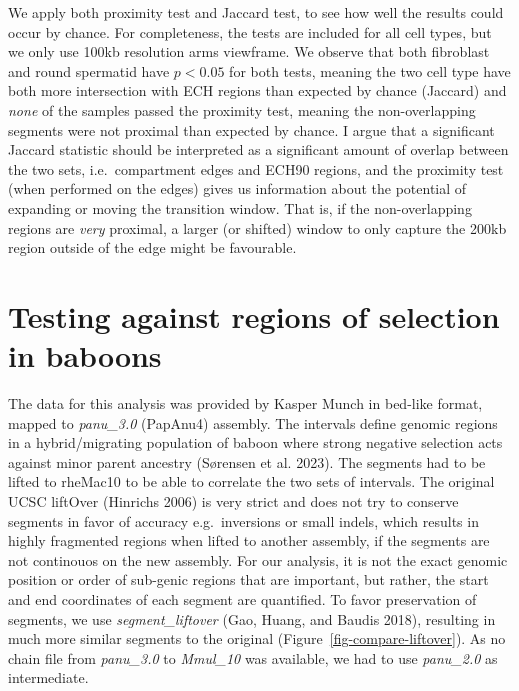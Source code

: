\documentclass[
  11pt,
  a4paper,
]{scrbook}
\let\oldemph\emph
\renewcommand\emph[1]{\oldemph{\color{gray}#1}}
\begin{document}
We apply both proximity test and Jaccard test, to see how well the
results could occur by chance. For completeness, the tests are included
for all cell types, but we only use 100kb resolution arms viewframe. We
observe that both fibroblast and round spermatid have \(p < 0.05\) for
both tests, meaning the two cell type have both more intersection with
ECH regions than expected by chance (Jaccard) and \emph{none} of the
samples passed the proximity test, meaning the non-overlapping segments
were not proximal than expected by chance. I argue that a significant
Jaccard statistic should be interpreted as a significant amount of
overlap between the two sets, i.e.~compartment edges and ECH90 regions,
and the proximity test (when performed on the edges) gives us
information about the potential of expanding or moving the transition
window. That is, if the non-overlapping regions are \emph{very}
proximal, a larger (or shifted) window to only capture the 200kb region
outside of the edge might be favourable.

\section{Testing against regions of selection in
baboons}\label{testing-against-regions-of-selection-in-baboons}

The data for this analysis was provided by Kasper Munch in bed-like
format, mapped to \emph{panu\_3.0} (PapAnu4) assembly. The intervals
define genomic regions in a hybrid/migrating population of baboon where
strong negative selection acts against minor parent ancestry (Sørensen
et al. 2023). The segments had to be lifted to rheMac10 to be able to
correlate the two sets of intervals. The original UCSC liftOver
(Hinrichs 2006) is very strict and does not try to conserve segments in
favor of accuracy e.g.~inversions or small indels, which results in
highly fragmented regions when lifted to another assembly, if the
segments are not continouos on the new assembly. For our analysis, it is
not the exact genomic position or order of sub-genic regions that are
important, but rather, the start and end coordinates of each segment are
quantified. To favor preservation of segments, we use
\emph{segment\_liftover} (Gao, Huang, and Baudis 2018), resulting in
much more similar segments to the original
(Figure~\ref{fig-compare-liftover}). As no chain file from
\emph{panu\_3.0} to \emph{Mmul\_10} was available, we had to use
\emph{panu\_2.0} as intermediate.
\end{document}
